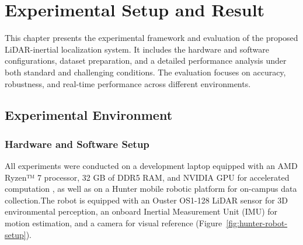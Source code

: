 \chapter{Experimental Setup and Result}
\label{ch:intro}
This chapter presents the experimental framework and evaluation of the proposed LiDAR-inertial localization system. It includes the hardware and software configurations, dataset preparation, and a detailed performance analysis under both standard and challenging conditions. The evaluation focuses on accuracy, robustness, and real-time performance across different environments.

\section{Experimental Environment}

\subsection{Hardware and Software Setup}
All experiments were conducted on a development laptop equipped with an AMD Ryzen™ 7 processor, 32 GB of DDR5 RAM, and NVIDIA GPU for accelerated computation , as well as on a Hunter mobile robotic platform for on-campus data collection.The robot is equipped with an Ouster OS1-128 LiDAR sensor for 3D environmental perception, an onboard Inertial Measurement Unit (IMU) for motion estimation, and a camera for visual reference (Figure~\ref{fig:hunter-robot-setup}).


